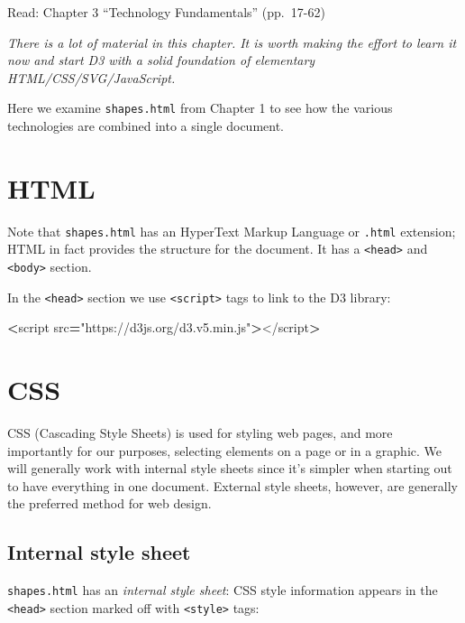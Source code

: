 \documentclass[openany]{book}
\newenvironment{Shaded}{\begin{snugshade}}{\end{snugshade}}
\newcommand{\NormalTok}[1]{#1}
\newcommand{\OperatorTok}[1]{\textcolor[rgb]{0.81,0.36,0.00}{\textbf{#1}}}
\newcommand{\StringTok}[1]{\textcolor[rgb]{0.31,0.60,0.02}{#1}}
\begin{document}
Read: Chapter 3 ``Technology Fundamentals'' (pp.~17-62)

\emph{There is a lot of material in this chapter. It is worth making the effort to learn it now and start D3 with a solid foundation of elementary HTML/CSS/SVG/JavaScript.}

Here we examine \texttt{shapes.html} from Chapter 1 to see how the various technologies are combined into a single document.

\hypertarget{html}{%
\section{HTML }\label{html}}

Note that \texttt{shapes.html} has an HyperText Markup Language or \texttt{.html} extension; HTML in fact provides the structure for the document. It has a \texttt{\textless{}head\textgreater{}} and \texttt{\textless{}body\textgreater{}} section.

In the \texttt{\textless{}head\textgreater{}} section we use \texttt{\textless{}script\textgreater{}} tags to link to the D3 library:

\begin{Shaded}
\begin{Highlighting}[]
\OperatorTok{<}\NormalTok{script src}\OperatorTok{=}\StringTok{"https://d3js.org/d3.v5.min.js"}\OperatorTok{>}\NormalTok{</script}\OperatorTok{>}
\end{Highlighting}
\end{Shaded}

\hypertarget{css}{%
\section{CSS }\label{css}}

CSS (Cascading Style Sheets) is used for styling web pages, and more importantly for our purposes, selecting elements on a page or in a graphic. We will generally work with internal style sheets since it's simpler when starting out to have everything in one document. External style sheets, however, are generally the preferred method for web design.

\hypertarget{internal-style-sheet}{%
\subsection{Internal style sheet}\label{internal-style-sheet}}

\texttt{shapes.html} has an \emph{internal style sheet}: CSS style information appears in the \texttt{\textless{}head\textgreater{}} section marked off with \texttt{\textless{}style\textgreater{}} tags:
\end{document}
